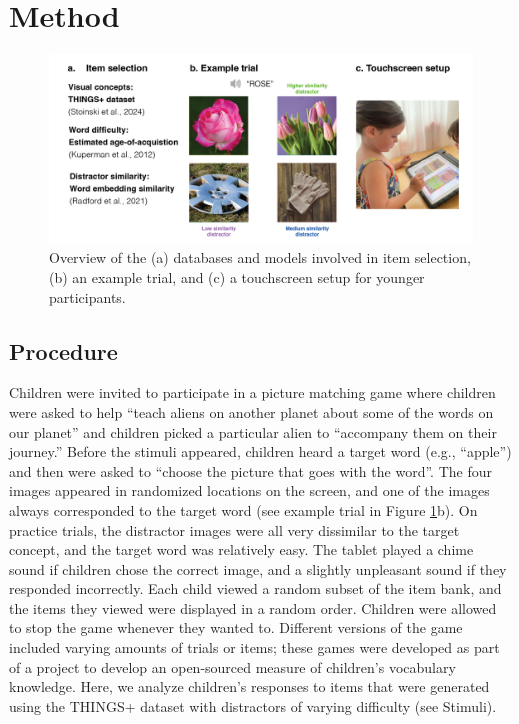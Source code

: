 \documentclass[
  man,mask]{apa6}
\begin{document}
\section{Method}\label{method}

\begin{figure}[H]

{\centering \includegraphics[width=1\linewidth]{visvocab-overview} 

}

\caption{Overview of the (a) databases and models involved in item selection, (b) an example trial, and (c) a touchscreen setup for younger participants. }\label{fig:procedure-figure}
\end{figure}

\subsection{Procedure}\label{procedure}

Children were invited to participate in a picture matching game where children were asked to help ``teach aliens on another planet about some of the words on our planet'' and children picked a particular alien to ``accompany them on their journey.'' Before the stimuli appeared, children heard a target word (e.g., ``apple'') and then were asked to ``choose the picture that goes with the word''. The four images appeared in randomized locations on the screen, and one of the images always corresponded to the target word (see example trial in Figure \ref{fig:procedure-figure}b). On practice trials, the distractor images were all very dissimilar to the target concept, and the target word was relatively easy. The tablet played a chime sound if children chose the correct image, and a slightly unpleasant sound if they responded incorrectly. Each child viewed a random subset of the item bank, and the items they viewed were displayed in a random order. Children were allowed to stop the game whenever they wanted to. Different versions of the game included varying amounts of trials or items; these games were developed as part of a project to develop an open-sourced measure of children's vocabulary knowledge. Here, we analyze children's responses to items that were generated using the THINGS+ dataset with distractors of varying difficulty (see Stimuli).
\end{document}
